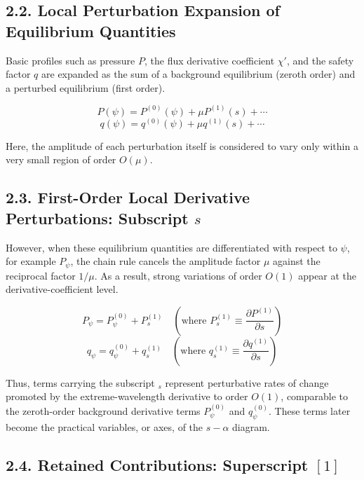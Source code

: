 \documentclass[11pt,a4paper]{article}
\begin{document}
\subsection{2.2. Local Perturbation Expansion of Equilibrium Quantities}\label{local-perturbation-expansion-of-equilibrium-quantities}

Basic profiles such as pressure \(P\), the flux derivative coefficient \(\chi'\),
and the safety factor \(q\) are expanded as the sum of a background equilibrium
(zeroth order) and a perturbed equilibrium (first order).

\[ P(\psi) = P^{(0)}(\psi) + \mu P^{(1)}(s) + \cdots \tag{19} \]
\[ q(\psi) = q^{(0)}(\psi) + \mu q^{(1)}(s) + \cdots \tag{20} \]

Here, the amplitude of each perturbation itself is considered to vary only within a
very small region of order \(O(\mu)\).

\subsection{2.3. First-Order Local Derivative Perturbations: Subscript \(s\)}\label{first-order-local-derivative-perturbations-subscript-s}

However, when these equilibrium quantities are differentiated with respect to
\(\psi\), for example \(P_\psi\), the chain rule cancels the amplitude factor
\(\mu\) against the reciprocal factor \(1/\mu\). As a result, strong variations of
order \(O(1)\) appear at the derivative-coefficient level.

\[ P_\psi = P_\psi^{(0)} + P_s^{(1)} \quad \left( \text{where } P_s^{(1)} \equiv \frac{\partial P^{(1)}}{\partial s} \right) \tag{21} \]
\[ q_\psi = q_\psi^{(0)} + q_s^{(1)} \quad \left( \text{where } q_s^{(1)} \equiv \frac{\partial q^{(1)}}{\partial s} \right) \tag{22} \]

Thus, terms carrying the subscript \(_s\) represent perturbative rates of change
promoted by the extreme-wavelength derivative to order \(O(1)\), comparable to the
zeroth-order background derivative terms \(P_\psi^{(0)}\) and \(q_\psi^{(0)}\).
These terms later become the practical variables, or axes, of the \(s-\alpha\)
diagram.

\subsection{2.4. Retained Contributions: Superscript \([1]\)}\label{retained-contributions-superscript-1}
\end{document}
